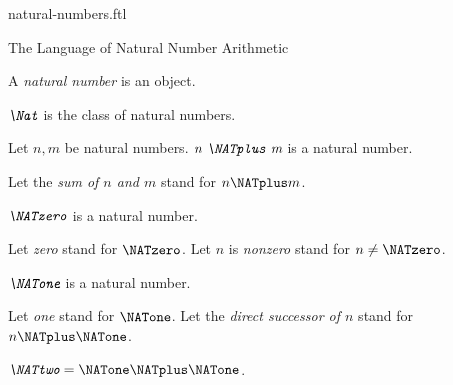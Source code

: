 \documentclass{naproche-library}
\begin{document}
\begin{smodule}[title=Natural Numbers]{natural-numbers.ftl}

\begin{sfragment}{The Language of Natural Number Arithmetic}

  \begin{signature}[forthel,id=ARITHMETIC_01_3074681254969344]
    A \emph{natural number} is an object.
  \end{signature}

  \begin{definition}[forthel,id=ARITHMETIC_01_7367148418629632]
    $\emph{\Nat}$ is the class of natural numbers.
  \end{definition}

  \begin{signature}[forthel,id=ARITHMETIC_01_1567933815848960]
    Let $n, m$ be natural numbers.
    $\emph{n \NATplus m}$ is a natural number.

    Let the \emph{sum of $n$ and $m$} stand for $n \NATplus m$.
  \end{signature}

  \begin{signature}[forthel,id=ARITHMETIC_01_7633304715001856]
    $\emph{\NATzero}$ is a natural number.

    Let \emph{zero} stand for $\NATzero$.
    Let $n$ is \emph{nonzero} stand for $n \neq \NATzero$.
  \end{signature}

  \begin{signature}[forthel,id=ARITHMETIC_01_1200254566985232]
    $\emph{\NATone}$ is a natural number.

    Let \emph{one} stand for $\NATone$.
    Let the \emph{direct successor of $n$} stand for $n \NATplus \NATone$.
  \end{signature}

  \begin{definition}[forthel,id=ARITHMETIC_01_4584236572999680]
    $\emph{\NATtwo} = \NATone \NATplus \NATone$.


\end{definition}
\end{sfragment}
\end{smodule}
\end{document}
